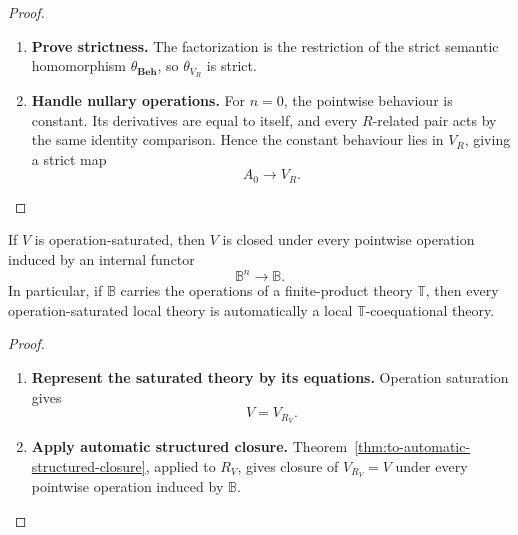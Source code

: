 \begin{proof}
\begin{enumerate}
        \item \textbf{Prove strictness.}
        The factorization is the restriction of the strict semantic
        homomorphism \(\theta_{\mathbf{Beh}}\), so
        \(\theta_{V_R}\) is strict.

        \item \textbf{Handle nullary operations.}
        For \(n=0\), the pointwise behaviour is constant. Its derivatives are
        equal to itself, and every \(R\)-related pair acts by the same
        identity comparison. Hence the constant behaviour lies in \(V_R\),
        giving a strict map
        \[
            A_0\to V_R.
        \]
    \end{enumerate}
\end{proof}

\begin{corollary}
\label{cor:to-saturated-theories-structured}
    If \(V\) is operation-saturated, then \(V\) is closed under every
    pointwise operation induced by an internal functor
    \[
        \mathbb B^n\to\mathbb B.
    \]
    In particular, if \(\mathbb B\) carries the operations of a finite-product
    theory \(\mathbb T\), then every operation-saturated local theory is
    automatically a local \(\mathbb T\)-coequational theory.
\end{corollary}

\begin{proof}
    \leavevmode
    \begin{enumerate}
        \item \textbf{Represent the saturated theory by its equations.}
        Operation saturation gives
        \[
            V=V_{R_V}.
        \]

        \item \textbf{Apply automatic structured closure.}
        Theorem~\ref{thm:to-automatic-structured-closure}, applied to
        \(R_V\), gives closure of \(V_{R_V}=V\) under every pointwise
        operation induced by \(\mathbb B\).
    \end{enumerate}
\end{proof}

